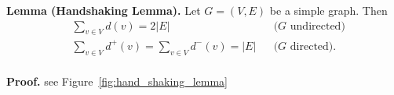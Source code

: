 \textbf{Lemma (Handshaking Lemma).} Let $G=(V,E)$ be a simple graph. Then
\begin{align*}
&\sum_{v\in V} d(v) = 2 |E| &&\text{($G$ undirected)} \\
&\sum_{v\in V} d^{+}(v) = \sum_{v\in V} d^{-}(v) = |E| &&\text{($G$ directed).} \\
\end{align*}

\textbf{Proof.} see Figure~\ref{fig:hand_shaking_lemma}

\begin{figure}[htb]
\centering
{}
\end{figure}
